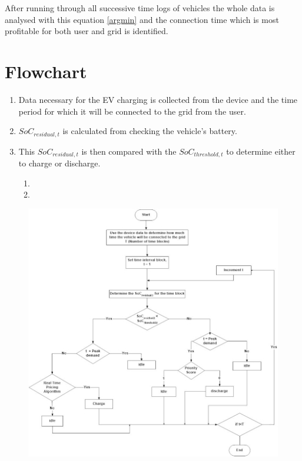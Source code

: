 	\noindent After running through all successive time logs of vehicles the whole data is analysed with this equation \eqref{argmin} and the connection time which is most profitable for both user and grid is identified.
	
	
	\section{Flowchart}
	
	\begin{enumerate}
		
		\item Data necessary for the EV charging is collected from the device and the time period for which it will be connected to the grid from the user.
		
		\item $SoC_{residual,t}$ is calculated from checking the vehicle's battery.
		
		\item This $SoC_{residual,t}$ is then compared with the $SoC_{threshold,t}$ to determine either to charge or discharge.
		
	
		\begin{enumerate}

			 \item 
			
			 \item
		
		\end{enumerate}
	\end{enumerate}
	
	\begin{figure}
		\centering
		\includegraphics[width=0.9\linewidth]{Figures/Ev_flowchart}
		\caption{}
		\label{fig:evflowchart}
	\end{figure}


